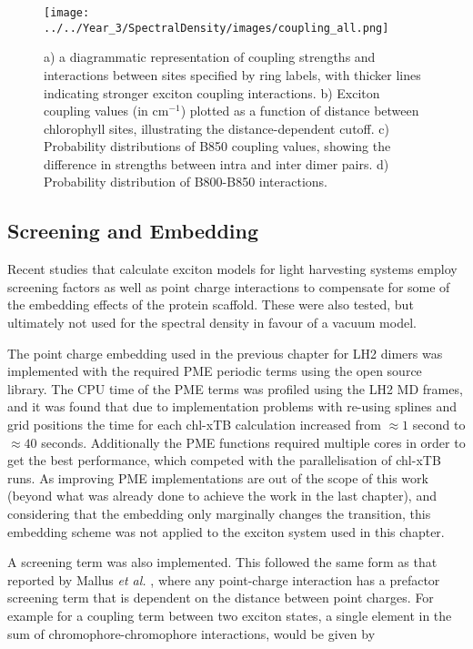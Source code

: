 \begin{figure}
    \centering
    \texttt{[image: ../../Year\_3/SpectralDensity/images/coupling\_all.png]}
    \label{fig:coupling_all}
    \caption{a) a diagrammatic representation of coupling strengths and interactions
    between sites specified by ring labels, with thicker lines indicating stronger
    exciton coupling interactions. b) Exciton coupling values (in $\text{cm}^{-1}$)
    plotted as a function of distance between chlorophyll sites, illustrating the
    distance-dependent cutoff. c) Probability distributions of B850 coupling values,
    showing the difference in strengths between intra and inter dimer pairs. d) 
    Probability distribution of B800-B850 interactions.}
\end{figure}

\subsection{Screening and Embedding}
\label{subsec:screening}

Recent studies that calculate exciton models for light harvesting systems employ
screening factors as well as point charge interactions to compensate for some of
the embedding effects of the protein scaffold. These were also tested, but ultimately
not used for the spectral density in favour of a vacuum model.

The point charge embedding used in the previous chapter for LH2 dimers was implemented 
with the required PME periodic terms using the open source  library.
The CPU time of the PME terms was profiled using the LH2 MD frames, and it was found
that due to implementation problems with re-using splines and grid positions the
time for each chl-xTB calculation increased from $\approx 1$ second to $\approx 40$
seconds. Additionally the PME functions required multiple cores in order to get
the best performance, which competed with the parallelisation of chl-xTB runs. As
improving PME implementations are out of the scope of this work (beyond what was 
already done to achieve the work in the last chapter), and considering that the
embedding only marginally changes the \Qy transition, this embedding scheme was
not applied to the exciton system used in this chapter.

A screening term was also implemented. This followed the same form as that reported
by Mallus \emph{et al.} \cite{Mallus2018}, where any point-charge interaction has
a prefactor screening term that is dependent on the distance between point charges.
For example for a coupling term between two exciton states, a single element in 
the sum of chromophore-chromophore interactions, would be given by

